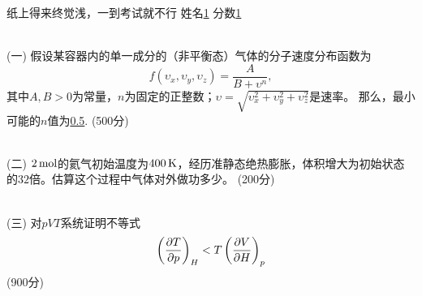 \documentclass[12pt,CJK]{article}
\def\mark#1{{\color{blue} (#1分)}}
\begin{document}
\bch


{\blue 纸上得来终觉浅，一到考试就不行} {} 姓名\uline{1} {\hskip 0.5in} 分数\uline{1}

{\vskip 0.3in}
\ \\
(一) 假设某容器内的单一成分的（非平衡态）气体的分子速度分布函数为
$$f(\upsilon_x, \upsilon_y,\upsilon_z) = \frac{A}{B + \upsilon^n},$$
其中$A, B>0$为常量，$n$为固定的正整数；$\upsilon=\sqrt{\upsilon_x^2+\upsilon_y^2+\upsilon_z^2}$是速率。
那么，最小可能的$n$值为\uline{0.5}. \mark{500}

{\vskip 0.1in}
\ \\
(二) $2\,\mathrm{mol}$的氦气初始温度为$400\,\mathrm{K}$，经历准静态绝热膨胀，体积增大为初始状态的$32$倍。估算这个过程中气体对外做功多少。\mark{200}

{\vskip 2.5in}
\ \\
(三) 对$pVT$系统证明不等式
  $$\left(\frac{\partial T}{\partial p}\right)_{H} < T \left(\frac{\partial V}{\partial H}\right)_{p} $$
  \mark{900}



\ech
\end{document}
